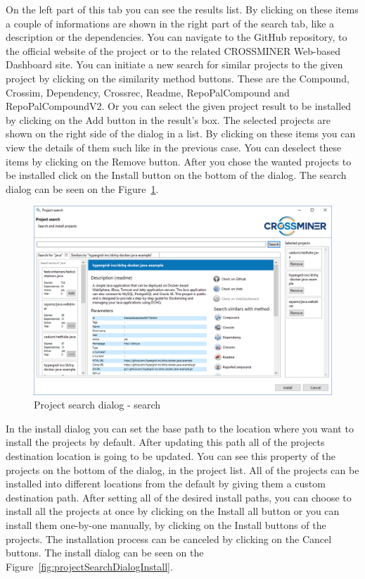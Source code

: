 \documentclass[11pt,a4paper]{book}
\begin{document}
On the left part of this tab you can see the results list. By clicking on these items a couple of informations are shown in the right part of the search tab, like a description or the dependencies. You can navigate to the GitHub repository, to the official website of the project or to the related CROSSMINER Web-based Dashboard site. You can initiate a new search for similar projects to the given project by clicking on the similarity method buttons. These are the Compound, Crossim, Dependency, Crossrec, Readme, RepoPalCompound and RepoPalCompoundV2. Or you can select the given project result to be installed by clicking on the Add button in the result's box. The selected projects are shown on the right side of the dialog in a list. By clicking on these items you can view the details of them such like in the previous case. You can deselect these items by clicking on the Remove button. After you chose the wanted projects to be installed click on the Install button on the bottom of the dialog. The search dialog can be seen on the Figure~\ref{fig:projectSearchDialogSearch}.

\begin{figure}[h]
	\centering
	\includegraphics[width=\linewidth]{pic/project-search-search.png}
	\caption{Project search dialog - search}
	\label{fig:projectSearchDialogSearch}
\end{figure}


In the install dialog you can set the base path to the location where you want to install the projects by default. After updating this path all of the projects destination location is going to be updated. You can see this property of the projects on the bottom of the dialog, in the project list. All of the projects can be installed into different locations from the default by giving them a custom destination path. After setting all of the desired install paths, you can choose to install all the projects at once by clicking on the Install all button or you can install them one-by-one manually, by clicking on the Install buttons of the projects. The installation process can be canceled by clicking on the Cancel buttons. The install dialog can be seen on the Figure~\ref{fig:projectSearchDialogInstall}.
\end{document}
